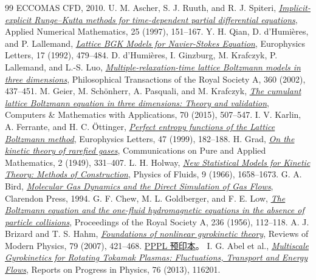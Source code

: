 \begin{thebibliography}{99}
ECCOMAS CFD, 2010.
U. M. Ascher, S. J. Ruuth, and R. J. Spiteri,
\href{https://doi.org/10.1016/S0168-9274(97)00056-1}{\emph{Implicit-explicit Runge--Kutta methods for time-dependent partial differential equations}},
Applied Numerical Mathematics, 25 (1997), 151--167.
Y. H. Qian, D. d'Humi\`eres, and P. Lallemand,
\href{https://doi.org/10.1209/0295-5075/17/6/001}{\emph{Lattice BGK Models for Navier-Stokes Equation}},
Europhysics Letters, 17 (1992), 479--484.
D. d'Humi\`eres, I. Ginzburg, M. Krafczyk, P. Lallemand, and L.-S. Luo,
\href{https://doi.org/10.1098/rsta.2001.0955}{\emph{Multiple-relaxation-time lattice Boltzmann models in three dimensions}},
Philosophical Transactions of the Royal Society A, 360 (2002), 437--451.
M. Geier, M. Sch\"onherr, A. Pasquali, and M. Krafczyk,
\href{https://doi.org/10.1016/j.camwa.2015.05.001}{\emph{The cumulant lattice Boltzmann equation in three dimensions: Theory and validation}},
Computers \& Mathematics with Applications, 70 (2015), 507--547.
I. V. Karlin, A. Ferrante, and H. C. \"Ottinger,
\href{https://doi.org/10.1209/epl/i1999-00370-1}{\emph{Perfect entropy functions of the Lattice Boltzmann method}},
Europhysics Letters, 47 (1999), 182--188.
H. Grad,
\href{https://doi.org/10.1002/cpa.3160020403}{\emph{On the kinetic theory of rarefied gases}},
Communications on Pure and Applied Mathematics, 2 (1949), 331--407.
L. H. Holway,
\href{https://doi.org/10.1063/1.1761920}{\emph{New Statistical Models for Kinetic Theory: Methods of Construction}},
Physics of Fluids, 9 (1966), 1658--1673.
G. A. Bird,
\href{https://doi.org/10.1093/oso/9780198561958.001.0001}{\emph{Molecular Gas Dynamics and the Direct Simulation of Gas Flows}},
Clarendon Press, 1994.
G. F. Chew, M. L. Goldberger, and F. E. Low,
\href{https://static.ias.edu/pitp/2016/sites/pitp/files/chew_goldberger_low_1956-1.pdf}{\emph{The Boltzmann equation and the one-fluid hydromagnetic equations in the absence of particle collisions}},
Proceedings of the Royal Society A, 236 (1956), 112--118.
A. J. Brizard and T. S. Hahm,
\href{https://doi.org/10.1103/RevModPhys.79.421}{\emph{Foundations of nonlinear gyrokinetic theory}},
Reviews of Modern Physics, 79 (2007), 421--468.
\href{https://bp-pub.pppl.gov/pub_report/2006/PPPL-4153.pdf}{PPPL 预印本}。
I. G. Abel et al.,
\href{https://arxiv.org/abs/1209.4782}{\emph{Multiscale Gyrokinetics for Rotating Tokamak Plasmas: Fluctuations, Transport and Energy Flows}},
Reports on Progress in Physics, 76 (2013), 116201.
\end{thebibliography}
